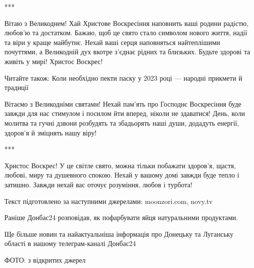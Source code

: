 ***

Вітаю з Великоднем! Хай Христове Воскресіння наповнить ваші родини радістю, любов'ю та достатком. Бажаю, щоб це свято стало символом нового життя, надії та віри у краще майбутнє. Нехай ваші серця наповняться найтеплішими почуттями, а Великодній дух вкотре з'єднає рідних та близьких. Будьте здорові та живіть у мирі! Христос Воскрес!

Читайте також: Коли необхідно пекти паску у 2023 році — народні прикмети й традиції

Вітаємо з Великодніми святами! Нехай пам'ять про Господнє Воскресіння буде
завжди для нас стимулом і посилом йти вперед, ніколи не здаватися! День, коли
молитва та гучні дзвони розбудять та збадьорять наші души, додадуть енергії,
здоров'я й зміцнять нашу віру!

***

Христос Воскрес! У це світле свято, можна тільки побажати здоров'я, щастя,
любові, миру та душевного спокою. Нехай у вашому домі завжди буде тепло і
затишно. Завжди нехай вас оточує розуміння, любов і турбота!

Текст підготовлено за наступними джерелами: moonzori.com, novy.tv

Раніше Донбас24 розповідав, як пофарбувати яйця натуральними продуктами.

Ще більше новин та найактуальніша інформація про Донецьку та Луганську області
в нашому телеграм-каналі Донбас24

ФОТО: з відкритих джерел
